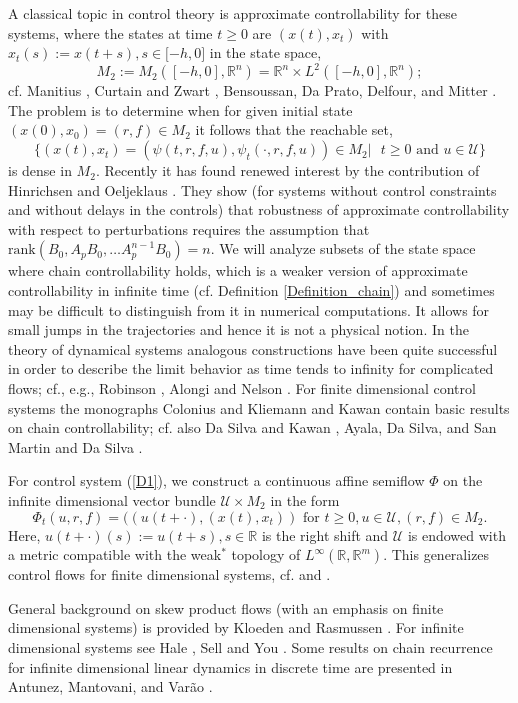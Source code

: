 \documentclass{siamltex}%
\begin{document}
A classical topic in control theory is approximate controllability for these
systems, where the states at time $t\geq0$ are $(x(t),x_{t})$ with
$x_{t}(s):=x(t+s),s\in\lbrack-h,0]$ in the state space,%
\[
M_{2}:=M_{2}([-h,0],\mathbb{R}^{n})=\mathbb{R}^{n}\times L^{2}%
([-h,0],\mathbb{R}^{n});
\]
cf. Manitius \cite{Man81}, Curtain and Zwart \cite{CurtZ}, Bensoussan, Da
Prato, Delfour, and Mitter \cite[Chapter 4]{BenDDM}. The problem is to
determine when for given initial state $(x(0),x_{0})=(r,f)\in M_{2}$ it
follows that the reachable set,%
\[
\{(x(t),x_{t})=(\psi(t,r,f,u),\psi_{t}(\cdot,r,f,u))\in M_{2}\left\vert
\text{\ }t\geq0\text{ and }u\in\mathcal{U}\right.  \}
\]
is dense in $M_{2}$. Recently it has found renewed interest by the
contribution of Hinrichsen and Oeljeklaus \cite{HinOel22}. They show (for
systems without control constraints and without delays in the controls) that
robustness of approximate controllability with respect to perturbations
requires the assumption that $\mathrm{rank}(B_{0},A_{p}B_{0},\ldots
A_{p}^{n-1}B_{0})=n$. We will analyze subsets of the state space where chain
controllability holds, which is a weaker version of approximate
controllability in infinite time (cf. Definition \ref{Definition_chain}) and
sometimes may be difficult to distinguish from it in numerical computations.
It allows for small jumps in the trajectories and hence it is not a physical
notion. In the theory of dynamical systems analogous constructions have been
quite successful in order to describe the limit behavior as time tends to
infinity for complicated flows; cf., e.g., Robinson \cite{Robin98}, Alongi and
Nelson \cite{AlonN07}. For finite dimensional control systems the monographs
Colonius and Kliemann \cite{ColK00} and Kawan \cite{Kawan13} contain basic
results on chain controllability; cf. also Da Silva and Kawan \cite{DSilK15},
Ayala, Da Silva, and San Martin \cite{AyaDSSM17} and Da Silva \cite{DaSilva23}.

For control system (\ref{D1}), we construct a continuous affine semiflow
$\Phi$ on the infinite dimensional vector bundle $\mathcal{U}\times M_{2}$ in
the form%
\[
\Phi_{t}(u,r,f)=((u(t+\cdot),(x(t),x_{t}))\text{ for }t\geq0,u\in
\mathcal{U},(r,f)\in M_{2}.
\]
Here, $u(t+\cdot)(s):=u(t+s),s\in\mathbb{R}$ is the right shift and
$\mathcal{U}$ is endowed with a metric compatible with the weak$^{\ast}$
topology of $L^{\infty}(\mathbb{R},\mathbb{R}^{m})$. This generalizes control
flows for finite dimensional systems, cf. \cite{ColK00} and \cite{Kawan13}.

General background on skew product flows (with an emphasis on finite
dimensional systems) is provided by Kloeden and Rasmussen \cite{KloedeR}. For
infinite dimensional systems see Hale \cite{Hale}, Sell and You \cite{SellY02}%
. Some results on chain recurrence for infinite dimensional linear dynamics in
discrete time are presented in Antunez, Mantovani, and Var\~{a}o
\cite{AntMV22}.
\end{document}
